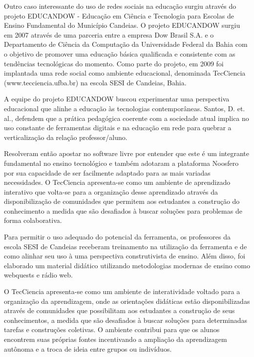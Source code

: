 Outro caso interessante do uso de redes sociais na educação surgiu através do
projeto EDUCANDOW \cite{santos2012} - Educação em Ciência e Tecnologia para
Escolas de Ensino Fundamental do Município Candeias. O projeto EDUCANDOW surgiu
em 2007 através de uma parceria entre a empresa Dow Brasil S.A. e o Departamento
de Ciência da Computação da Universidade Federal da Bahia com o objetivo de
promover uma educação básica qualificada e consistente com as tendências tecnológicas
do momento. Como parte do projeto, em 2009 foi implantada uma rede social como
ambiente educacional, denominada TecCiencia (www.tecciencia.ufba.br) na escola
SESI de Candeias, Bahia.

A equipe do projeto EDUCANDOW buscou experimentar uma perspectiva educacional que
alinhe a educação às tecnologias contemporâneas. Santos, D. et. al., \cite{santos2012}
defendem que a prática pedagógica coerente com a sociedade atual implica no uso
constante de ferramentas digitais e na educação em rede para quebrar a verticalização
da relação professor/aluno.

Resolveram então apostar no software livre por entender que este é um integrante
fundamental no ensino tecnológico e também adotaram a plataforma Noosfero por sua
capacidade de ser facilmente adaptado para as mais variadas necessidades. O
TecCiencia apresenta-se como um ambiente de aprendizado interativo que volta-se
para a organização desse aprendizado através da disponibilização de comunidades
que permitem aos estudantes a construção do conhecimento a medida que são
desafiados à buscar soluções para problemas de forma colaborativa.

Para permitir o uso adequado do potencial da ferramenta, os professores da escola
SESI de Candeias receberam treinamento na utilização da ferramenta e de como alinhar
seu uso à uma perspectiva construtivista de ensino. Além disso, foi elaborado um
material didático utilizando metodologias modernas de ensino como webquests e
rádio web.

O TecCiencia apresenta-se como um ambiente de interatividade voltado para a
organização da aprendizagem, onde as orientações didáticas estão disponibilizadas
através de comunidades que possibilitam aos estudantes a construção de seus
conhecimentos, a medida que são desafiados à buscar soluções para determinadas
tarefas e construções coletivas. O ambiente contribui para que os alunos encontrem
suas próprias fontes incentivando a ampliação da aprendizagem autônoma e a
troca de ideia entre grupos ou indivíduos.

